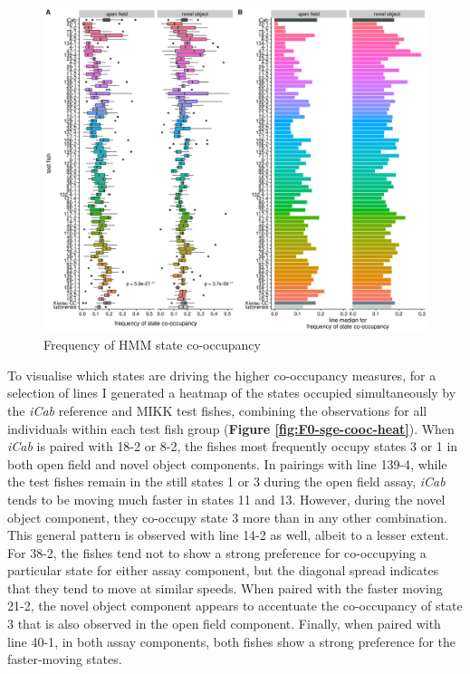 \documentclass[
]{book}
\begin{document}
\begin{figure}
\includegraphics[width=1\linewidth]{figs/mikk_behaviour/0.08_15_cooc_box_all} \caption{Frequency of HMM state co-occupancy}\label{fig:F0-sge-cooc-box}
\end{figure}

To visualise which states are driving the higher co-occupancy measures, for a selection of lines I generated a heatmap of the states occupied simultaneously by the \emph{\textcolor{iCab_424B4D}{iCab}} reference and MIKK test fishes, combining the observations for all individuals within each test fish group (\textbf{Figure \ref{fig:F0-sge-cooc-heat}}). When \emph{\textcolor{iCab_424B4D}{iCab}} is paired with \textcolor{18-2_FF66A6}{18-2} or \textcolor{8-2_FF699C}{8-2}, the fishes most frequently occupy states 3 or 1 in both open field and novel object components. In pairings with line \textcolor{139-4_FF61CC}{139-4}, while the test fishes remain in the still states 1 or 3 during the open field assay, \emph{\textcolor{iCab_424B4D}{iCab}} tends to be moving much faster in states 11 and 13. However, during the novel object component, they co-occupy state 3 more than in any other combination. This general pattern is observed with line \textcolor{14-2_F066EA}{14-2} as well, albeit to a lesser extent. For \textcolor{38-2_00C08B}{38-2}, the fishes tend not to show a strong preference for co-occupying a particular state for either assay component, but the diagonal spread indicates that they tend to move at similar speeds. When paired with the faster moving \textcolor{21-2_49B500}{21-2}, the novel object component appears to accentuate the co-occupancy of state 3 that is also observed in the open field component. Finally, when paired with line \textcolor{40-1_93AA00}{40-1}, in both assay components, both fishes show a strong preference for the faster-moving states.
\end{document}
